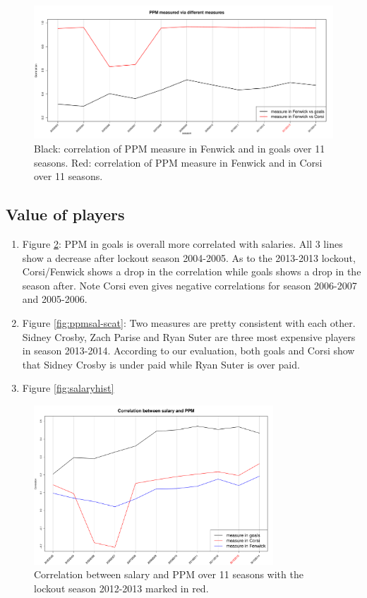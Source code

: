 \begin{figure}[htb!]
	\centering
	\includegraphics[width=\textwidth]{figures/ppm-corr-diffmeasure-season.pdf}
	\caption{Black: correlation of PPM measure in Fenwick and in goals over 11 seasons.  Red: correlation of PPM measure in Fenwick and in Corsi over 11 seasons.}\label{fig:ppm-corr-diffmeasure-season}
\end{figure}

\subsection{Value of players}

\begin{enumerate}
	\item Figure \ref{fig:ppmsal-corr-season}: PPM in goals is overall more correlated with salaries. All 3 lines show a decrease after lockout season 2004-2005. As to the 2013-2013 lockout, Corsi/Fenwick shows a drop in the correlation while goals shows a drop in the season after. Note Corsi even gives negative correlations for season 2006-2007 and 2005-2006. 
	\item Figure \ref{fig:ppmsal-scat}: Two measures are pretty consistent with each other. Sidney Crosby, Zach Parise and Ryan Suter are three most expensive players in season 2013-2014. According to our evaluation, both goals and Corsi show that Sidney Crosby is under paid while Ryan Suter is over paid. 
	\item Figure \ref{fig:salaryhist}
\end{enumerate}

\begin{figure}[htb!]
	\centering
	\includegraphics[width=0.8\textwidth]{figures/ppmsal-corr-season.pdf}
	\caption{Correlation between salary and PPM over 11 seasons with the lockout season 2012-2013 marked in red.}\label{fig:ppmsal-corr-season}
\end{figure}

